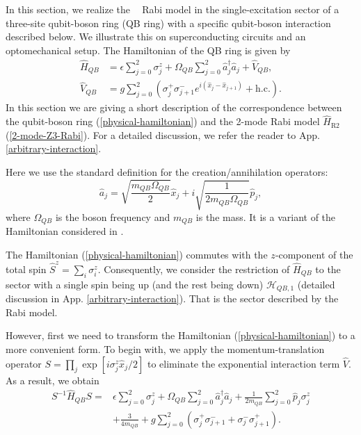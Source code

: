 \documentclass[reprint, aps, prx, amsmath, amssymb, longbibliography, superscriptaddress]{revtex4-2}
\DeclareMathOperator{\Zthree}{\mathbb{Z}_3}
\begin{document}
In this section, we realize the $\Zthree$ Rabi model in the single-excitation sector of a three-site qubit-boson ring (QB ring) with a specific qubit-boson interaction described below. We illustrate this on superconducting circuits and an optomechanical setup. The  Hamiltonian of the QB ring is given by
\begin{equation}
\label{physical-hamiltonian}
  \begin{aligned}
    \hat H_{QB} &= \epsilon \sum\limits_{j=0}^2 \sigma_j^z + \Omega_{QB} \sum\limits_{j=0}^2  \hat a_j^{\dagger} \hat a_j + \hat V_{QB},  \\
    \hat V_{QB} &= g \sum\limits_{j=0}^2 \left( \sigma_j^+ \sigma_{j+1}^- e^{i (\hat x_j - \hat x_{j+1})}  + \text{h.c.} \right).
  \end{aligned}
\end{equation}
In this section we are giving a short description of the correspondence between the qubit-boson ring (\ref{physical-hamiltonian}) and the 2-mode Rabi model $\hat H_{\text{R}2}$ (\ref{2-mode-Z3-Rabi}). For a detailed discussion, we refer the reader to App. \ref{arbitrary-interaction}.

Here we use the standard definition for the creation/annihilation operators:
\begin{equation}
    \hat a_j = \sqrt{\frac{m_{QB}\Omega_{QB}}{2}} \hat x_j + i \sqrt{\frac{1}{2 m_{QB} \Omega_{QB}}} \hat p_j,
\end{equation}
where $\Omega_{QB}$ is the boson frequency and $m_{QB}$ is the mass. It is a variant of the Hamiltonian considered in \cite{sedov_chiral_2020}.

The Hamiltonian (\ref{physical-hamiltonian}) commutes with the $z$‑component of the total spin $\hat S^z = \sum_i \sigma_i^z$. Consequently, we consider the restriction of $\hat H_{QB}$ to the sector with a single spin being up (and the rest being down) $\mathcal{H}_{QB,1}$ (detailed discussion in App. \ref{arbitrary-interaction}). That is the sector described by the $\Zthree$ Rabi model.

However, first we need to transform the Hamiltonian (\ref{physical-hamiltonian}) to a more convenient form. To begin with, we apply the momentum-translation operator $S = \prod_j \exp[i \sigma_j^z \hat x_j/2]$ to eliminate the exponential interaction term $\hat V $. As a result, we obtain
\begin{equation}
\label{after-momentum-translation}
\begin{aligned}
    S^{-1} \hat H_{QB} S =& \epsilon \sum\limits_{j=0}^2 \sigma_j^z + \Omega_{QB} \sum\limits_{j=0}^2  \hat a_j^{\dagger} \hat a_j + \frac{1}{2m_{QB}} \sum\limits_{j=0}^2  \hat p_j \sigma_j^z   \\
    &+\frac{3}{4 m_{QB}} + g\sum\limits_{j=0}^2 \left(\sigma_{j}^+ \sigma_{j+1}^- + \sigma_{j}^- \sigma_{j+1}^+\right).
\end{aligned}
\end{equation}
\end{document}
